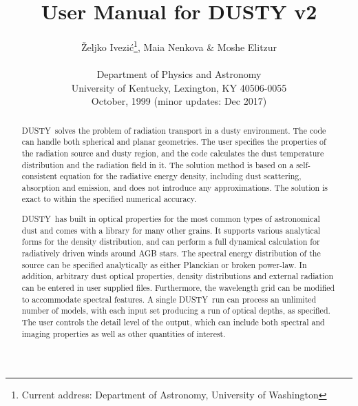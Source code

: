 \documentclass[12pt]{article} \usepackage{epsf}
\def\D  {{\sf DUSTY}}
\def\Ivezic {Ivezi\'c}
\def\tthdump#1{#1}      %
\begin{document}
\title                  {\sc User Manual for DUSTY v2}

\author{ \v Zeljko \Ivezic\footnote{Current address:
                Department of Astronomy,
                University of Washington},
        Maia Nenkova \& Moshe Elitzur
        \\ \\ Department of Physics and Astronomy
        \\    University of Kentucky, Lexington, KY 40506-0055
        \\    [0.5in] October, 1999 (minor updates: Dec 2017)}
\date{}
\maketitle

\vfil
\begin{abstract}

\D\ solves the problem of radiation transport in a dusty environment.  The code
can handle both spherical and planar geometries.   The user specifies the
properties of the radiation source and dusty region, and the code calculates
the dust temperature distribution and the radiation field in it. The solution
method is based on a self-consistent equation for the radiative energy density,
including dust scattering, absorption and emission, and does not introduce any
approximations. The solution is exact to within the specified numerical
accuracy.

\D\ has built in optical properties for the most common types of astronomical
dust and comes with a library for many other grains. It supports various
analytical forms for the density distribution, and can perform a full dynamical
calculation for radiatively driven winds around AGB stars. The spectral energy
distribution of the source can be specified analytically as either Planckian or
broken power-law. In addition, arbitrary dust optical properties, density
distributions and external radiation can be entered in user supplied files.
Furthermore, the wavelength grid can be modified to accommodate spectral
features.  A single \D\ run can process an unlimited number of models, with
each input set producing a run of optical depths, as specified. The user
controls the detail level of the output, which can include both spectral and
imaging properties as well as other quantities of interest.

\end{abstract}

\newpage
\tthdump{\vglue 1in}
\end{document}
